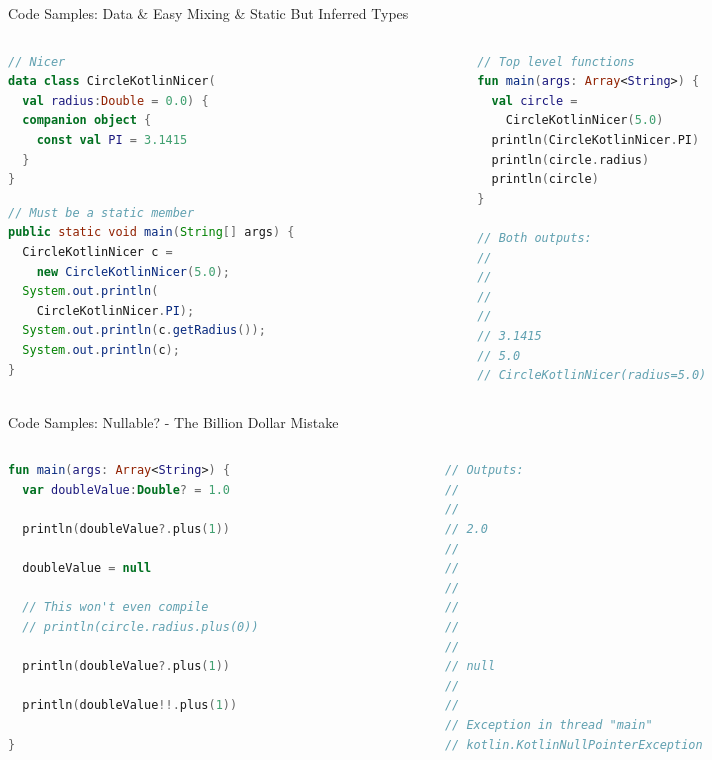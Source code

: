 \begin{frame}[fragile]{Code Samples: Data \& Easy Mixing \& Static But Inferred Types}
	\begin{columns}
		\begin{column}{0.5\textwidth}
\begin{lstlisting}[language=Kotlin,basicstyle=\ttfamily\tiny]
// Nicer
data class CircleKotlinNicer(
  val radius:Double = 0.0) {
  companion object {
    const val PI = 3.1415
  }
}
\end{lstlisting}
\begin{lstlisting}[language=java,basicstyle=\ttfamily\tiny]
// Must be a static member
public static void main(String[] args) {
  CircleKotlinNicer c =
    new CircleKotlinNicer(5.0);
  System.out.println(
    CircleKotlinNicer.PI);
  System.out.println(c.getRadius());
  System.out.println(c);
}
\end{lstlisting}
		\end{column}
		\begin{column}{0.5\textwidth}
\begin{lstlisting}[language=Kotlin,basicstyle=\ttfamily\tiny]
// Top level functions
fun main(args: Array<String>) {
  val circle =
    CircleKotlinNicer(5.0)
  println(CircleKotlinNicer.PI)
  println(circle.radius)
  println(circle)
}

// Both outputs:
// 
// 
// 
//
// 3.1415
// 5.0
// CircleKotlinNicer(radius=5.0)
\end{lstlisting}
		\end{column}
	\end{columns}
\end{frame}

\begin{frame}[fragile]{Code Samples: Nullable? - The Billion Dollar Mistake}
	\begin{columns}
		\begin{column}{0.5\textwidth}
\begin{lstlisting}[language=Kotlin,basicstyle=\ttfamily\tiny]
fun main(args: Array<String>) {
  var doubleValue:Double? = 1.0

  println(doubleValue?.plus(1))

  doubleValue = null

  // This won't even compile
  // println(circle.radius.plus(0))

  println(doubleValue?.plus(1))

  println(doubleValue!!.plus(1))

}
\end{lstlisting}
		\end{column}
		\begin{column}{0.5\textwidth}
\begin{lstlisting}[language=Kotlin,basicstyle=\ttfamily\tiny]
// Outputs:
//
//
// 2.0
// 
// 
// 
// 
// 
//
// null
// 
//
// Exception in thread "main"
// kotlin.KotlinNullPointerException
\end{lstlisting}
		\end{column}
	\end{columns}
\end{frame}


